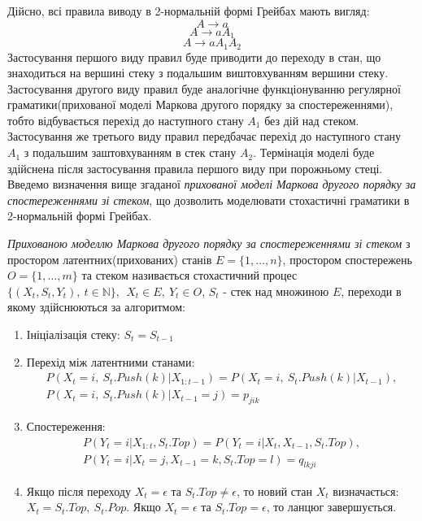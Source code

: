 Дійсно, всі правила виводу в 2-нормальній формі Грейбах мають вигляд:
$$ A \rightarrow a $$
$$ A \rightarrow a A_1 $$
$$ A \rightarrow a A_1 A_2 $$
Застосування першого виду правил буде приводити до переходу в стан, що знаходиться на вершині стеку з подальшим виштовхуванням вершини стеку. Застосування другого виду правил буде аналогічне функціонуванню регулярної граматики(прихованої моделі Маркова другого порядку за спостереженнями), тобто відбувається перехід до наступного стану $A_1$ без дій над стеком. Застосування же третього виду правил передбачає перехід до наступного стану $A_1$ з подальшим заштовхуванням в стек стану $A_2$. Термінація моделі буде здійснена після застосування правила першого виду при порожньому стеці.
Введемо визначення вище згаданої \textit{прихованої моделі Маркова другого порядку за спостереженнями зі стеком}, що дозволить моделювати стохастичні граматики в 2-нормальній формі Грейбах.
\begin{definition}
  \textit{Прихованою моделлю Маркова другого порядку за спостереженнями зі стеком} з простором латентних(прихованих) станів $E = \{ 1,\dots,n \}$, простором спостережень $O = \{ 1,\dots,m \}$ та стеком  називається стохастичний процес $ \{ (X_t, S_t, Y_t),\ t \in \mathbb{N} \},\ \ X_t \in E,\ Y_t \in O $, $S_t$ - стек над множиною $E$, переходи в якому здійснюються за алгоритмом:
  \begin{enumerate}
    \item Ініціалізація стеку: $S_t = S_{t-1}$
    \item Перехід між латентними станами:
    \begin{multline}
      P(X_t = i,\ S_t.Push(k) | X_{1:t-1}) = P(X_t = i,\ S_t.Push(k) | X_{t-1}),\\
      P(X_t = i,\ S_t.Push(k) | X_{t-1} = j) = p_{jik}
    \end{multline}

    \item Спостереження:
    \begin{multline}
      P(Y_t = i | X_{1:t}, S_t.Top ) = P(Y_t = i | X_t, X_{t-1}, S_t.Top),\\
      P(Y_t = i | X_t = j, X_{t-1} = k, S_t.Top = l) = q_{lkji}
    \end{multline}
    \item Якщо після переходу $X_t = \epsilon$ та $ S_t.Top \neq \epsilon $, то новий стан $X_t$ визначається: $ X_t = S_t.Top,\ S_t.Pop $. Якщо $X_t = \epsilon$ та $ S_t.Top = \epsilon $, то ланцюг завершується.
  \end{enumerate}
\end{definition}
